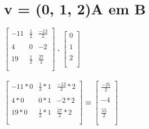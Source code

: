 \documentclass{article}
\begin{document}
\section{v = (0, 1, 2)A em B}
\begin{hbox}{

$\left[
\begin{array} {rrr}
-11 & \frac{1}{2} & \frac{-13}{2}\\\\
4 & 0 & -2\\\\
19 & \frac{1}{2} & \frac{27}{2}\\\\
\end{array}
\right]
$
\textbf{.}
$\left[
\begin{array} {c}
0\\\\
1\\\\
2\\\\
\end{array}
\right]
$
\\\rightarrow\\
$\left[
\begin{array} {rrr}
-11*0 & \frac{1}{2}*1 & \frac{-13}{2}*2\\\\
4*0 & 0*1 & -2*2\\\\
19*0 & \frac{1}{2}*1 & \frac{27}{2}*2\\\\
\end{array}
\right]
$
\textbf{=}
$\left[
\begin{array} {c}
\frac{-25}{2}\\\\
-4\\\\
\frac{55}{2}\\\\
\end{array}
\right]
$}
\end{hbox}

\newpage
\end{document}

